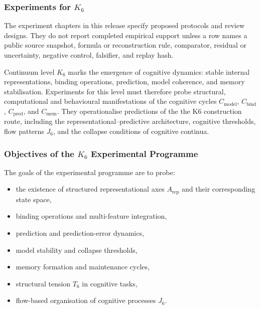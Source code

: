 
\subsubsection{Experiments for \texorpdfstring{$K_6$}{K_6}}

The experiment chapters in this release specify proposed protocols and review designs. They do not report completed empirical support unless a row names a public source snapshot, formula or reconstruction rule, comparator, residual or uncertainty, negative control, falsifier, and replay hash.
\label{sec:experiments-k6}

Continuum level $K_6$ marks the emergence of cognitive dynamics:
stable internal representations, binding operations, prediction,
model coherence, and memory stabilisation.
Experiments for this level must therefore probe structural,
computational and behavioural manifestations of the cognitive
cycles $C_{\mathrm{model}}$, $C_{\mathrm{bind}}$,
$C_{\mathrm{pred}}$, and $C_{\mathrm{mem}}$.
They operationalise predictions of the the K6 construction route, including
the representational–predictive architecture, cognitive thresholds,
flow patterns $J_6$, and the collapse conditions of cognitive continua.



\subsubsection{Objectives of the \texorpdfstring{$K_6$}{K_6} Experimental Programme}

The goals of the experimental programme are to probe:

\begin{itemize}
    \item the existence of structured representational axes
          $A_{\mathrm{rep}}$ and their corresponding state space,
    \item binding operations and multi-feature integration,
    \item prediction and prediction-error dynamics,
    \item model stability and collapse thresholds,
    \item memory formation and maintenance cycles,
    \item structural tension $T_6$ in cognitive tasks,
    \item flow-based organisation of cognitive processes $J_6$.
\end{itemize}




